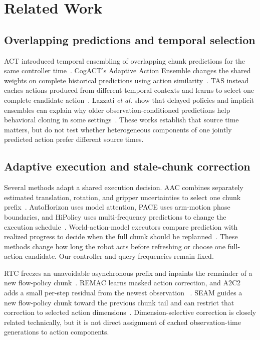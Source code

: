 \section{Related Work}
\label{sec:related}

\subsection{Overlapping predictions and temporal selection}

ACT introduced temporal ensembling of overlapping chunk predictions for the
same controller time~\cite{zhao2023act}. CogACT's Adaptive Action Ensemble
changes the shared weights on complete historical predictions using action
similarity~\cite{li2024cogact}. TAS instead caches actions produced from
different temporal contexts and learns to select one complete candidate
action~\cite{weng2025tas}. Lazzati \emph{et al.} show that delayed policies and
implicit ensembles can explain why older observation-conditioned predictions
help behavioral cloning in some settings~\cite{lazzati2026why}. These works
establish that source time matters, but do not test whether heterogeneous
components of one jointly predicted action prefer different source times.

\subsection{Adaptive execution and stale-chunk correction}

Several methods adapt a shared execution decision. AAC combines separately
estimated translation, rotation, and gripper uncertainties to select one chunk
prefix~\cite{liang2026aac}. AutoHorizon uses model attention, PACE uses
arm-motion phase boundaries, and HiPolicy uses multi-frequency predictions to
change the execution schedule~\cite{wang2026autohorizon,nie2026pace,zhang2026hipolicy}.
World-action-model executors compare prediction with realized progress to
decide when the full chunk should be replanned~\cite{wang2026trust,ye2026tempowam}.
These methods change how long the robot acts before refreshing or choose one
full-action candidate. Our controller and query frequencies remain fixed.

RTC freezes an unavoidable asynchronous prefix and inpaints the remainder of a
new flow-policy chunk~\cite{black2025rtc}. REMAC learns masked action correction,
and A2C2 adds a small per-step residual from the newest observation
~\cite{wang2026remac,sendai2025a2c2}. SEAM guides a new flow-policy chunk toward
the previous chunk tail and can restrict that correction to selected action
dimensions~\cite{zhan2026seam}. Dimension-selective correction is closely
related technically, but it is not direct assignment of cached
observation-time generations to action components.

